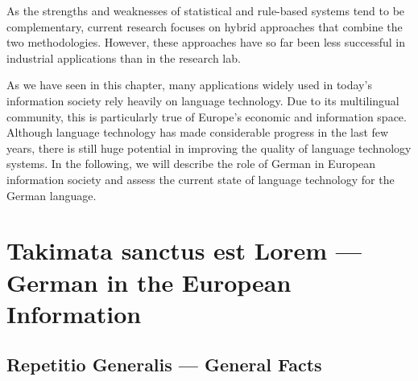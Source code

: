 \documentclass[]{../metanetpaper}
\begin{document}
\begin{Parallel}[c]{80mm}{80mm}
{    As the strengths and weaknesses of statistical and rule-based systems tend to be complementary, current research focuses on hybrid approaches that combine the two methodologies. However, these approaches have so far been less successful in industrial applications than in the research lab. 

    As we have seen in this chapter, many applications widely used in today’s information society rely heavily on language technology. Due to its multilingual community, this is particularly true of Europe’s economic and information space. Although language technology has made considerable progress in the last few years, there is still huge potential in improving the quality of language technology systems. In the following, we will describe the role of German in European information society and assess the current state of language technology for the German language.
  }

  \ParallelPar

  \clearpage
  

  \section{Takimata sanctus est Lorem --- German in the European Information} 
  
  
  \subsection{Repetitio Generalis --- General Facts}

\end{Parallel}
\end{document}
